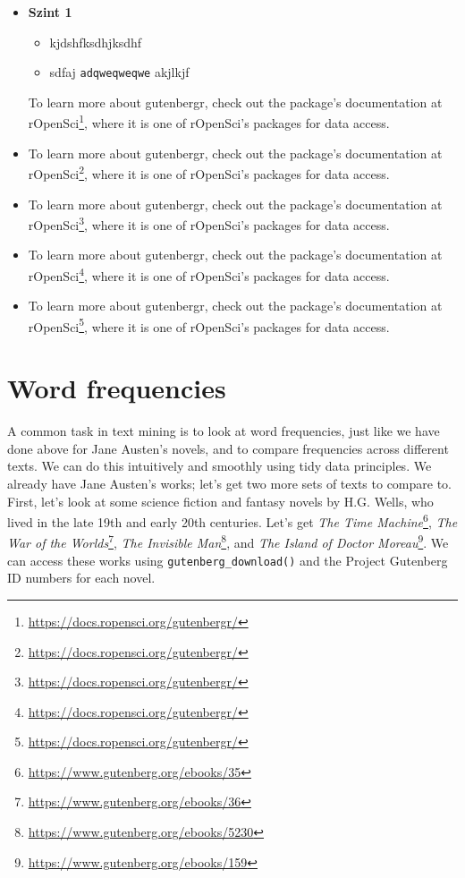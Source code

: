 \documentclass[
]{book}
\DeclareRobustCommand{\href}[2]{#2\footnote{\url{#1}}}
\providecommand{\tightlist}{%
  \setlength{\itemsep}{0pt}\setlength{\parskip}{0pt}}
\newenvironment{rmdblock}[1]
  {\begin{shaded*}
  \begin{itemize}
  \renewcommand{\labelitemi}{
    \raisebox{-.7\height}[0pt][0pt]{
      {\setkeys{Gin}{width=3em,keepaspectratio}\texttt{[image: images/\#1]}}
    }
  }
  \item
  }
  {
  \end{itemize}
  \end{shaded*}
  }
\newenvironment{rmdlevel1}
  {\begin{rmdblock}{level1}}
  {\end{rmdblock}}
\newenvironment{rmdlevel2}
  {\begin{rmdblock}{level2}}
  {\end{rmdblock}}
\newenvironment{rmdlevel3}
  {\begin{rmdblock}{level3}}
  {\end{rmdblock}}
\newenvironment{rmdsummary}
  {\begin{rmdblock}{summary}}
  {\end{rmdblock}}
\newenvironment{rmdexercise}
  {\begin{rmdblock}{exercise}}
  {\end{rmdblock}}
\begin{document}
\begin{rmdlevel1}
\textbf{Szint 1}

\begin{itemize}
\tightlist
\item
  kjdshfksdhjksdhf
\item
  sdfaj \texttt{adqweqweqwe} akjlkjf
\end{itemize}

To learn more about gutenbergr, check out the
\href{https://docs.ropensci.org/gutenbergr/}{package's documentation at
rOpenSci}, where it is one of rOpenSci's packages for data access.
\end{rmdlevel1}

\begin{rmdlevel2}
To learn more about gutenbergr, check out the
\href{https://docs.ropensci.org/gutenbergr/}{package's documentation at
rOpenSci}, where it is one of rOpenSci's packages for data access.
\end{rmdlevel2}

\begin{rmdlevel3}
To learn more about gutenbergr, check out the
\href{https://docs.ropensci.org/gutenbergr/}{package's documentation at
rOpenSci}, where it is one of rOpenSci's packages for data access.
\end{rmdlevel3}

\begin{rmdsummary}
To learn more about gutenbergr, check out the
\href{https://docs.ropensci.org/gutenbergr/}{package's documentation at
rOpenSci}, where it is one of rOpenSci's packages for data access.
\end{rmdsummary}

\begin{rmdexercise}
To learn more about gutenbergr, check out the
\href{https://docs.ropensci.org/gutenbergr/}{package's documentation at
rOpenSci}, where it is one of rOpenSci's packages for data access.
\end{rmdexercise}

\hypertarget{word-frequencies}{%
\section{Word frequencies}\label{word-frequencies}}

A common task in text mining is to look at word frequencies, just like we have done above for Jane Austen's novels, and to compare frequencies across different texts. We can do this intuitively and smoothly using tidy data principles. We already have Jane Austen's works; let's get two more sets of texts to compare to. First, let's look at some science fiction and fantasy novels by H.G. Wells, who lived in the late 19th and early 20th centuries. Let's get \href{https://www.gutenberg.org/ebooks/35}{\emph{The Time Machine}}, \href{https://www.gutenberg.org/ebooks/36}{\emph{The War of the Worlds}}, \href{https://www.gutenberg.org/ebooks/5230}{\emph{The Invisible Man}}, and \href{https://www.gutenberg.org/ebooks/159}{\emph{The Island of Doctor Moreau}}. We can access these works using \texttt{gutenberg\_download()} and the Project Gutenberg ID numbers for each novel.
\end{document}
